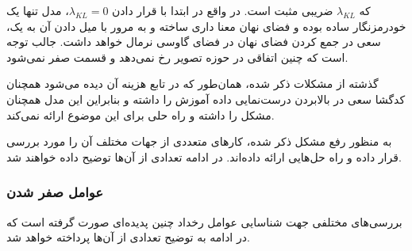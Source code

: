 که $\lambda_{KL}$ ضریبی مثبت است. در واقع در ابتدا با قرار دادن $\lambda_{KL}=0$، مدل تنها یک خودرمزنگار ساده بوده و فضای نهان معنا داری ساخته و به مرور با میل دادن آن به یک، سعی در جمع کردن فضای نهان در فضای گاوسی نرمال خواهد داشت. جالب توجه است که چنین اتفاقی در حوزه تصویر رخ نمی‌دهد و قسمت  صفر نمی‌شود.

گذشته از مشکلات ذکر شده، همان‌طور که در تابع هزینه آن دیده می‌شود همچنان کدگشا سعی در بالابردن درست‌نمایی داده آموزش را داشته و بنابراین این مدل همچنان مشکل \expbias{} را داشته و راه حلی برای این موضوع ارائه نمی‌کند.

به منظور رفع مشکل ذکر شده، کارهای متعددی از جهات مختلف آن را مورد بررسی قرار داده و راه حل‌هایی ارائه داده‌اند. در ادامه تعدادی از آن‌ها توضیح داده خواهند شد.
\subsubsection{عوامل صفر شدن }
بررسی‌های مختلفی جهت شناسایی عوامل رخداد چنین پدیده‌ای صورت گرفته است که در ادامه به توضیح تعدادی از آن‌ها پرداخته خواهد شد.
